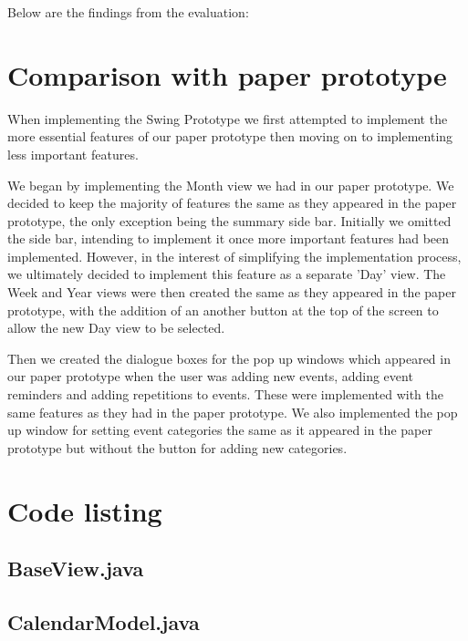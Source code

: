\documentclass{article}
\begin{document}
Below are the findings from the evaluation:

\section{Comparison with paper prototype}

When implementing the Swing Prototype we first attempted to implement
the more essential features of our paper prototype then moving on to
implementing less important features.

We began by implementing the Month view we had in our paper prototype.
We decided to keep the majority of features the same as they appeared
in the paper prototype, the only exception being the summary side bar.
Initially we omitted the side bar, intending to implement it once more
important features had been implemented. However, in the interest of
simplifying the implementation process, we ultimately decided to
implement this feature as a separate 'Day' view. The Week and Year
views were then created the same as they appeared in the paper
prototype, with the addition of an another button at the top of the
screen to allow the new Day view to be selected.

Then we created the dialogue boxes for the pop up windows which appeared in our
paper prototype when the user was adding new events, adding event
reminders and adding repetitions to events. These were implemented with
the same features as they had in the paper prototype. We also
implemented the pop up window for setting event categories the same as
it appeared in the paper prototype but without the button for adding new
categories.

\newpage

\appendix

\section{Code listing}

\subsection{BaseView.java}



\subsection{CalendarModel.java}


\end{document}
